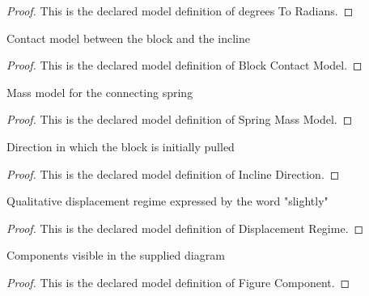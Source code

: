 \begin{proof}
  This is the declared model definition of degrees To Radians.
\end{proof}
\begin{definition}
  \label{def:physics:phyx-mini-0257:phyxminiproblems-problemphyxmini0257-blockcontactmodel}
  Contact model between the block and the incline
\end{definition}
\begin{proof}
  This is the declared model definition of Block Contact Model.
\end{proof}
\begin{definition}
  \label{def:physics:phyx-mini-0257:phyxminiproblems-problemphyxmini0257-springmassmodel}
  Mass model for the connecting spring
\end{definition}
\begin{proof}
  This is the declared model definition of Spring Mass Model.
\end{proof}
\begin{definition}
  \label{def:physics:phyx-mini-0257:phyxminiproblems-problemphyxmini0257-inclinedirection}
  Direction in which the block is initially pulled
\end{definition}
\begin{proof}
  This is the declared model definition of Incline Direction.
\end{proof}
\begin{definition}
  \label{def:physics:phyx-mini-0257:phyxminiproblems-problemphyxmini0257-displacementregime}
  Qualitative displacement regime expressed by the word "slightly"
\end{definition}
\begin{proof}
  This is the declared model definition of Displacement Regime.
\end{proof}
\begin{definition}
  \label{def:physics:phyx-mini-0257:phyxminiproblems-problemphyxmini0257-figurecomponent}
  Components visible in the supplied diagram
\end{definition}
\begin{proof}
  This is the declared model definition of Figure Component.
\end{proof}
